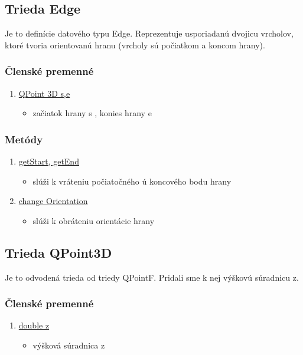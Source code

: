 \documentclass[12pt]{article}
\begin{document}
\subsection{Trieda Edge}
Je to definície datového typu Edge. Reprezentuje usporiadanú dvojicu vrcholov, ktoré tvoria orientovanú hranu (vrcholy sú počiatkom a koncom hrany).

\subsubsection{Členské premenné}
\begin{enumerate}

\item[] \underline {QPoint 3D s,e}
\begin{itemize}
\item začiatok hrany s , konies hrany e
\end{itemize}
\end{enumerate}

\subsubsection{Metódy}
\begin{enumerate}
\item[] \underline{getStart, getEnd}
\begin{itemize}
\item slúži k vráteniu počiatočného ú koncového bodu hrany
\end{itemize}
\item[] \underline{change Orientation}
\begin{itemize}
\item slúži k obráteniu orientácie hrany
\end{itemize}
\end{enumerate}

\subsection{Trieda QPoint3D}
Je to odvodená trieda od triedy QPointF. Pridali sme k nej výškovú súradnicu z. 

\subsubsection{Členské premenné}

\begin{enumerate}
\item[] \underline {double z}
\begin{itemize}
\item výšková súradnica z
\end{itemize}
\end{enumerate}
\end{document}
